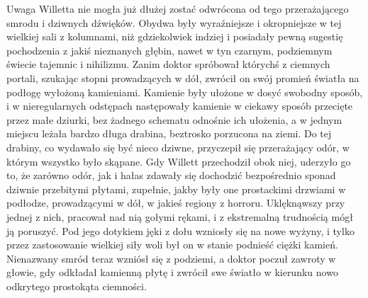 Uwaga Willetta nie mogła już dłużej zostać odwrócona od tego przerażającego smrodu i dziwnych dźwięków. Obydwa były wyraźniejsze i okropniejsze w tej wielkiej sali z kolumnami, niż gdziekolwiek indziej i posiadały pewną sugestię pochodzenia z jakiś nieznanych głębin, nawet w tyn czarnym, podziemnym świecie tajemnic i nihilizmu. Zanim doktor spróbował którychś z ciemnych portali, szukając stopni prowadzących w dół, zwrócił on swój promień światła na podłogę wyłożoną kamieniami. Kamienie były ułożone w dosyć swobodny sposób, i w nieregularnych odstępach następowały kamienie w ciekawy sposób przecięte przez małe dziurki, bez żadnego schematu odnośnie ich ułożenia, a w jednym miejscu leżała bardzo długa drabina, beztrosko porzucona na ziemi. Do tej drabiny, co wydawało się być nieco dziwne, przyczepił się przerażający odór, w którym wszystko było skąpane. Gdy Willett przechodził obok niej, uderzyło go to, że zarówno odór, jak i hałas zdawały się dochodzić bezpośrednio sponad dziwnie przebitymi płytami, zupełnie, jakby były one prostackimi drzwiami w podłodze, prowadzącymi w dół, w jakieś regiony z horroru. Uklęknąwszy przy jednej z nich, pracował nad nią gołymi rękami, i z ekstremalną trudnością mógł ją poruszyć. Pod jego dotykiem jęki z dołu wzniosły się na nowe wyżyny, i tylko przez zastosowanie wielkiej siły woli był on w stanie podnieść ciężki kamień. Nienazwany smród teraz wzniósł się z podziemi, a doktor poczuł zawroty w głowie, gdy odkładał kamienną płytę i zwrócił swe światło w kierunku nowo odkrytego prostokąta ciemności. 

